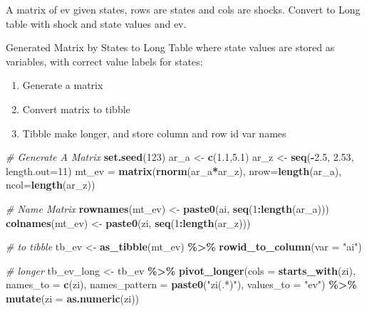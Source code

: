 \documentclass[
]{book}
\newenvironment{Shaded}{\begin{snugshade}}{\end{snugshade}}
\newcommand{\CommentTok}[1]{\textcolor[rgb]{0.56,0.35,0.01}{\textit{#1}}}
\newcommand{\DataTypeTok}[1]{\textcolor[rgb]{0.13,0.29,0.53}{#1}}
\newcommand{\DecValTok}[1]{\textcolor[rgb]{0.00,0.00,0.81}{#1}}
\newcommand{\FloatTok}[1]{\textcolor[rgb]{0.00,0.00,0.81}{#1}}
\newcommand{\KeywordTok}[1]{\textcolor[rgb]{0.13,0.29,0.53}{\textbf{#1}}}
\newcommand{\NormalTok}[1]{#1}
\newcommand{\OperatorTok}[1]{\textcolor[rgb]{0.81,0.36,0.00}{\textbf{#1}}}
\newcommand{\StringTok}[1]{\textcolor[rgb]{0.31,0.60,0.02}{#1}}
\providecommand{\tightlist}{%
  \setlength{\itemsep}{0pt}\setlength{\parskip}{0pt}}
\begin{document}
A matrix of ev given states, rows are states and cols are shocks. Convert to Long table with shock and state values and ev.

Generated Matrix by States to Long Table where state values are stored as variables, with correct value labels for states:

\begin{enumerate}
\def\labelenumi{\arabic{enumi}.}
\tightlist
\item
  Generate a matrix
\item
  Convert matrix to tibble
\item
  Tibble make longer, and store column and row id var names
\end{enumerate}

\begin{Shaded}
\begin{Highlighting}[]
\CommentTok{\# Generate A Matrix}
\KeywordTok{set.seed}\NormalTok{(}\DecValTok{123}\NormalTok{)}
\NormalTok{ar\_a \textless{}{-}}\StringTok{ }\KeywordTok{c}\NormalTok{(}\FloatTok{1.1}\NormalTok{,}\FloatTok{5.1}\NormalTok{)}
\NormalTok{ar\_z \textless{}{-}}\StringTok{ }\KeywordTok{seq}\NormalTok{(}\OperatorTok{{-}}\FloatTok{2.5}\NormalTok{, }\FloatTok{2.53}\NormalTok{, }\DataTypeTok{length.out=}\DecValTok{11}\NormalTok{)}
\NormalTok{mt\_ev =}\StringTok{ }\KeywordTok{matrix}\NormalTok{(}\KeywordTok{rnorm}\NormalTok{(ar\_a}\OperatorTok{*}\NormalTok{ar\_z), }\DataTypeTok{nrow=}\KeywordTok{length}\NormalTok{(ar\_a), }\DataTypeTok{ncol=}\KeywordTok{length}\NormalTok{(ar\_z))}

\CommentTok{\# Name Matrix}
\KeywordTok{rownames}\NormalTok{(mt\_ev) \textless{}{-}}\StringTok{ }\KeywordTok{paste0}\NormalTok{(}\StringTok{\textquotesingle{}ai\textquotesingle{}}\NormalTok{, }\KeywordTok{seq}\NormalTok{(}\DecValTok{1}\OperatorTok{:}\KeywordTok{length}\NormalTok{(ar\_a)))}
\KeywordTok{colnames}\NormalTok{(mt\_ev) \textless{}{-}}\StringTok{ }\KeywordTok{paste0}\NormalTok{(}\StringTok{\textquotesingle{}zi\textquotesingle{}}\NormalTok{, }\KeywordTok{seq}\NormalTok{(}\DecValTok{1}\OperatorTok{:}\KeywordTok{length}\NormalTok{(ar\_z)))}

\CommentTok{\# to tibble}
\NormalTok{tb\_ev \textless{}{-}}\StringTok{ }\KeywordTok{as\_tibble}\NormalTok{(mt\_ev) }\OperatorTok{\%\textgreater{}\%}\StringTok{ }\KeywordTok{rowid\_to\_column}\NormalTok{(}\DataTypeTok{var =} \StringTok{"ai"}\NormalTok{)}

\CommentTok{\# longer}
\NormalTok{tb\_ev\_long \textless{}{-}}\StringTok{ }\NormalTok{tb\_ev }\OperatorTok{\%\textgreater{}\%}
\StringTok{  }\KeywordTok{pivot\_longer}\NormalTok{(}\DataTypeTok{cols =} \KeywordTok{starts\_with}\NormalTok{(}\StringTok{\textquotesingle{}zi\textquotesingle{}}\NormalTok{),}
               \DataTypeTok{names\_to =} \KeywordTok{c}\NormalTok{(}\StringTok{\textquotesingle{}zi\textquotesingle{}}\NormalTok{),}
               \DataTypeTok{names\_pattern =} \KeywordTok{paste0}\NormalTok{(}\StringTok{"zi(.*)"}\NormalTok{),}
               \DataTypeTok{values\_to =} \StringTok{"ev"}\NormalTok{) }\OperatorTok{\%\textgreater{}\%}
\StringTok{  }\KeywordTok{mutate}\NormalTok{(}\DataTypeTok{zi =} \KeywordTok{as.numeric}\NormalTok{(zi))}


\end{Highlighting}
\end{Shaded}
\end{document}
